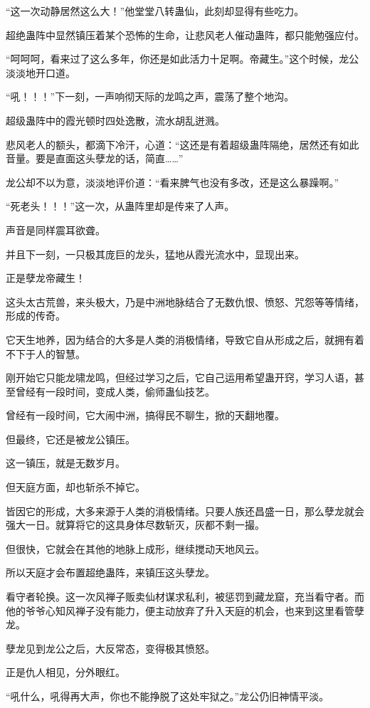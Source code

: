 \begin{this_body}
“这一次动静居然这么大！”他堂堂八转蛊仙，此刻却显得有些吃力。

超绝蛊阵中显然镇压着某个恐怖的生命，让悲风老人催动蛊阵，都只能勉强应付。

“呵呵呵，看来过了这么多年，你还是如此活力十足啊。帝藏生。”这个时候，龙公淡淡地开口道。

“吼！！！”下一刻，一声响彻天际的龙鸣之声，震荡了整个地沟。

超级蛊阵中的霞光顿时四处逸散，流水胡乱迸溅。

悲风老人的额头，都滴下冷汗，心道：“这还是有着超级蛊阵隔绝，居然还有如此音量。要是直面这头孽龙的话，简直……”

龙公却不以为意，淡淡地评价道：“看来脾气也没有多改，还是这么暴躁啊。”

“死老头！！！”这一次，从蛊阵里却是传来了人声。

声音是同样震耳欲聋。

并且下一刻，一只极其庞巨的龙头，猛地从霞光流水中，显现出来。

正是孽龙帝藏生！

这头太古荒兽，来头极大，乃是中洲地脉结合了无数仇恨、愤怒、咒怨等等情绪，形成的传奇。

它天生地养，因为结合的大多是人类的消极情绪，导致它自从形成之后，就拥有着不下于人的智慧。

刚开始它只能龙啸龙鸣，但经过学习之后，它自己运用希望蛊开窍，学习人语，甚至曾经有一段时间，变成人类，偷师蛊仙技艺。

曾经有一段时间，它大闹中洲，搞得民不聊生，掀的天翻地覆。

但最终，它还是被龙公镇压。

这一镇压，就是无数岁月。

但天庭方面，却也斩杀不掉它。

皆因它的形成，大多来源于人类的消极情绪。只要人族还昌盛一日，那么孽龙就会强大一日。就算将它的这具身体尽数斩灭，灰都不剩一撮。

但很快，它就会在其他的地脉上成形，继续搅动天地风云。

所以天庭才会布置超绝蛊阵，来镇压这头孽龙。

看守者轮换。这一次风禅子贩卖仙材谋求私利，被惩罚到藏龙窟，充当看守者。而他的爷爷心知风禅子没有能力，便主动放弃了升入天庭的机会，也来到这里看管孽龙。

孽龙见到龙公之后，大反常态，变得极其愤怒。

正是仇人相见，分外眼红。

“吼什么，吼得再大声，你也不能挣脱了这处牢狱之。”龙公仍旧神情平淡。


\end{this_body}
